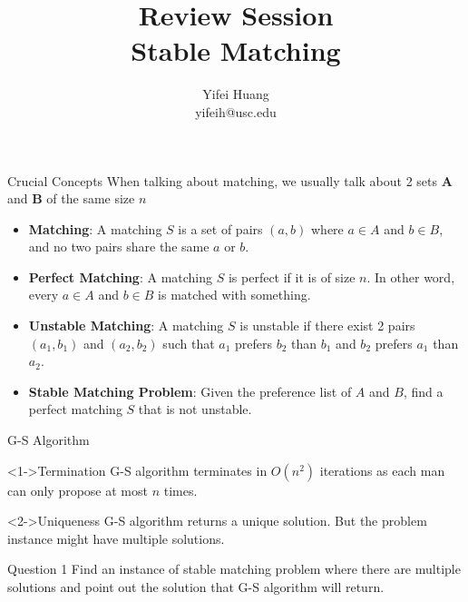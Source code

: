 \documentclass{beamer}
\title{Review Session\\ Stable Matching}
\author{Yifei Huang \\ yifeih@usc.edu}
\begin{document}
\begin{frame}
	\maketitle
\end{frame}
\begin{frame}{Crucial Concepts}
	When talking about matching, we usually talk about 2 sets \textbf{A} and \textbf{B} of the same size $n$
	\begin{itemize}
		\item<1-> \textbf{Matching}: A matching $S$ is a set of pairs $(a,b)$ where $a \in A$ and $b \in B$, and no two
			pairs share the same $a$ or $b$.
		\item<2-> \textbf{Perfect Matching}: A matching $S$ is perfect if it is of size $n$. In other word, every $a \in A$
			and $b \in B$ is matched with something.
		\item<3-> \textbf{Unstable Matching}: A matching $S$ is unstable if there exist 2 pairs $(a_1,b_1)$ and $(a_2,b_2)$
			such that $a_1$ prefers $b_2$ than $b_1$ and $b_2$ prefers $a_1$ than $a_2$.
		\item<4-> \textbf{Stable Matching Problem}: Given the preference list of $A$ and $B$, find a perfect matching $S$
			that is not unstable.
	\end{itemize}
\end{frame}

\begin{frame}{G-S Algorithm}
	\begin{block}<1->{Termination}
		G-S algorithm terminates in $O(n^2)$ iterations as each man can only propose at most $n$ times.
	\end{block}
	\begin{alertblock}<2->{Uniqueness}
		G-S algorithm returns a unique solution. But the problem instance might have multiple solutions.
	\end{alertblock}
\end{frame}

\begin{frame}{Question 1}
	Find an instance of stable matching problem where there are multiple solutions and point out the solution that G-S
	algorithm will return.
\end{frame}
\end{document}
